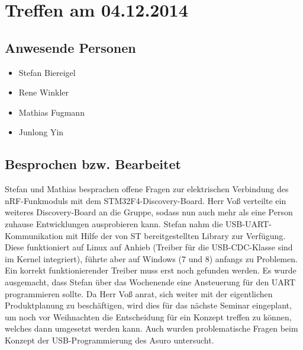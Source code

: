 \chapter{Treffen am 04.12.2014}
\section{Anwesende Personen}
\begin{itemize}
	\item Stefan Biereigel
	\item Rene Winkler
	\item Mathias Fugmann
	\item Junlong Yin
\end{itemize}

\section{Besprochen bzw. Bearbeitet}
Stefan und Mathias besprachen offene Fragen zur elektrischen Verbindung des nRF-Funkmoduls mit dem STM32F4-Discovery-Board. Herr Voß verteilte ein weiteres Discovery-Board an die Gruppe, sodass nun auch mehr als eine Person zuhause Entwicklungen ausprobieren kann.
Stefan nahm die USB-UART-Kommunikation mit Hilfe der von ST bereitgestellten Library zur Verfügung. Diese funktioniert auf Linux auf Anhieb (Treiber für die USB-CDC-Klasse sind im Kernel integriert), führte aber auf Windows (7 und 8) anfangs zu Problemen. Ein korrekt funktionierender Treiber muss erst noch gefunden werden.
Es wurde ausgemacht, dass Stefan über das Wochenende eine Ansteuerung für den UART programmieren sollte.
Da Herr Voß anrat, sich weiter mit der eigentlichen Produktplanung zu beschäftigen, wird dies für das nächste Seminar eingeplant, um noch vor Weihnachten die Entscheidung für ein Konzept treffen zu können, welches dann umgesetzt werden kann. Auch wurden problematische Fragen beim Konzept der USB-Programmierung des Asuro untersucht. 